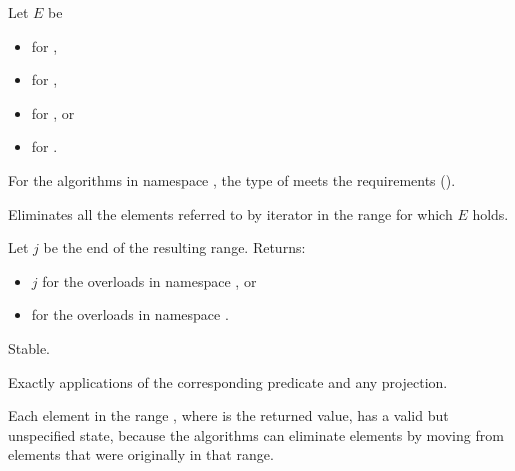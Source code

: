 \begin{itemdescr}
\pnum
Let $E$ be
\begin{itemize}
\item {} for ,
\item {} for ,
\item {} for , or
\item {} for .
\end{itemize}

\pnum
\expects
For the algorithms in namespace ,
the type of 
meets the  requirements ().

\pnum
\effects
Eliminates all the elements referred to by iterator 
in the range  for which $E$ holds.

\pnum
\returns
Let $j$ be the end of the resulting range. Returns:
\begin{itemize}
\item $j$ for the overloads in namespace , or
\item {} for the overloads in namespace .
\end{itemize}

\pnum
\remarks
Stable.

\pnum
\complexity
Exactly  applications
of the corresponding predicate and any projection.

\pnum
\begin{note}
Each element in the range ,
where  is the returned value,
has a valid but unspecified state,
because the algorithms can eliminate elements
by moving from elements that were originally in that range.
\end{note}
\end{itemdescr}

